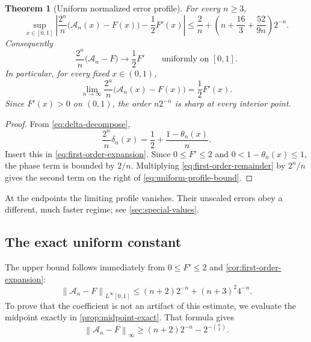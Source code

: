\documentclass[11pt,oneside]{article}
\newtheorem{theorem}{Theorem}[section]
\theoremstyle{definition}
\theoremstyle{remark}
\newcommand{\norm}[1]{\left\lVert #1\right\rVert}
\newcommand{\abs}[1]{\left\lvert #1\right\rvert}
\begin{document}
\begin{theorem}[Uniform normalized error profile]
\label{thm:pointwise-rate}
For every $n\ge3$,
\begin{equation}
 \boxed{\displaystyle
 \sup_{x\in[0,1]}
 \abs{\frac{2^n}{n}\bigl(\mathcal A_n(x)-F(x)\bigr)
       -\frac12F'(x)}
 \le \frac2n+
 \left(n+\frac{16}{3}+\frac{52}{9n}\right)2^{-n}.}          \label{eq:uniform-profile-bound}
\end{equation}
Consequently
\begin{equation}
 \frac{2^n}{n}\bigl(\mathcal A_n-F\bigr)
 \longrightarrow\frac12F'
 \qquad\text{uniformly on }[0,1].                           \label{eq:uniform-profile-limit}
\end{equation}
In particular, for every fixed $x\in(0,1)$,
\begin{equation}
 \lim_{n\to\infty}
 \frac{2^n}{n}\bigl(\mathcal A_n(x)-F(x)\bigr)
 =\frac12F'(x).                                             \label{eq:pointwise-rate}
\end{equation}
Since $F'(x)>0$ on $(0,1)$, the order $n2^{-n}$ is sharp at every interior
point.
\end{theorem}

\begin{proof}
From \eqref{eq:delta-decompose},
\begin{equation*}
 \frac{2^n}{n}\delta_n(x)
 =\frac12+\frac{1-\theta_n(x)}{n}.
\end{equation*}
Insert this in \eqref{eq:first-order-expansion}.  Since $0\le F'\le2$ and
$0<1-\theta_n(x)\le1$, the phase term is bounded by $2/n$.  Multiplying
\eqref{eq:first-order-remainder} by $2^n/n$ gives the second term on the
right of \eqref{eq:uniform-profile-bound}.
\end{proof}

At the endpoints the limiting profile vanishes.  Their unscaled errors obey a
different, much faster regime; see \cref{sec:special-values}.

\subsection{The exact uniform constant}

The upper bound follows immediately from $0\le F'\le2$ and
\cref{cor:first-order-expansion}:
\begin{equation}
 \norm{\mathcal A_n-F}_{L^\infty[0,1]}
 \le (n+2)2^{-n}+(n+3)^2 4^{-n}.                           \label{eq:uniform-upper}
\end{equation}
To prove that the coefficient is not an artifact of this estimate, we evaluate
the midpoint exactly in \cref{prop:midpoint-exact}.  That formula gives
\begin{equation}
 \norm{\mathcal A_n-F}_{\infty}
 \ge (n+2)2^{-n}-2^{-\binom n2}.                           \label{eq:uniform-lower}
\end{equation}
\end{document}
